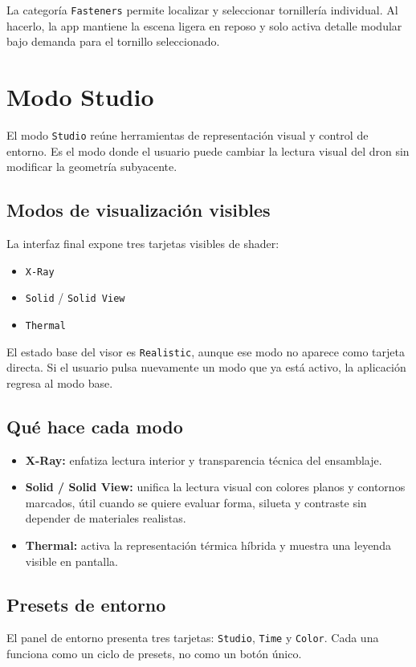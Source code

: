 \documentclass[12pt,letterpaper]{article}
\begin{document}
\noindent La categoría \texttt{Fasteners} permite localizar y seleccionar tornillería individual. Al hacerlo, la app mantiene la escena ligera en reposo y solo activa detalle modular bajo demanda para el tornillo seleccionado.

\section{Modo Studio}
El modo \texttt{Studio} reúne herramientas de representación visual y control de entorno. Es el modo donde el usuario puede cambiar la lectura visual del dron sin modificar la geometría subyacente.

\subsection{Modos de visualización visibles}
La interfaz final expone tres tarjetas visibles de shader:
\begin{itemize}
    \item \texttt{X-Ray}
    \item \texttt{Solid} / \texttt{Solid View}
    \item \texttt{Thermal}
\end{itemize}

\noindent El estado base del visor es \texttt{Realistic}, aunque ese modo no aparece como tarjeta directa. Si el usuario pulsa nuevamente un modo que ya está activo, la aplicación regresa al modo base.

\subsection{Qué hace cada modo}
\begin{itemize}
    \item \textbf{X-Ray:} enfatiza lectura interior y transparencia técnica del ensamblaje.
    \item \textbf{Solid / Solid View:} unifica la lectura visual con colores planos y contornos marcados, útil cuando se quiere evaluar forma, silueta y contraste sin depender de materiales realistas.
    \item \textbf{Thermal:} activa la representación térmica híbrida y muestra una leyenda visible en pantalla.
\end{itemize}

\subsection{Presets de entorno}
El panel de entorno presenta tres tarjetas: \texttt{Studio}, \texttt{Time} y \texttt{Color}. Cada una funciona como un ciclo de presets, no como un botón único.
\end{document}
